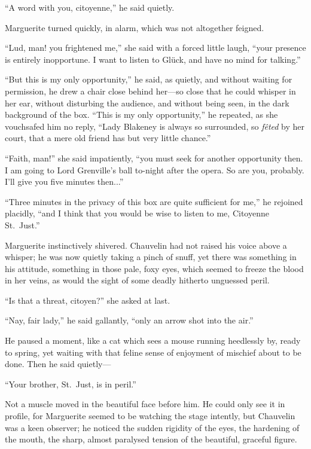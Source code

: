 \documentclass[paper=5.5in:8.5in,BCOR=7mm,twoside,DIV=calc,12pt,usegeometry,chapterprefix,endperiod,headings=big]{scrbook}
\begin{document}
\enquote{A word with you, citoyenne,} he said quietly.

Marguerite turned quickly, in alarm, which was not altogether feigned.

\enquote{Lud, man! you frightened me,} she said with a forced little laugh, \enquote{your presence is entirely inopportune. I want to listen to Glück, and have no mind for talking.}

\enquote{But this is my only opportunity,} he said, as quietly, and without waiting for permission, he drew a chair close behind her---so close that he could whisper in her ear, without disturbing the audience, and without being seen, in the dark background of the box. \enquote{This is my only opportunity,} he repeated, as she vouchsafed him no reply, \enquote{Lady Blakeney is always so surrounded, so \textit{fêted} by her court, that a mere old friend has but very little chance.}

\enquote{Faith, man!} she said impatiently, \enquote{you must seek for another opportunity then. I am going to Lord Grenville's ball to-night after the opera. So are you, probably. I'll give you five minutes then...}

\enquote{Three minutes in the privacy of this box are quite sufficient for me,} he rejoined placidly, \enquote{and I think that you would be wise to listen to me, Citoyenne St.~Just.}

Marguerite instinctively shivered. Chauvelin had not raised his voice above a whisper; he was now quietly taking a pinch of snuff, yet there was something in his attitude, something in those pale, foxy eyes, which seemed to freeze the blood in her veins, as would the sight of some deadly hitherto unguessed peril.

\enquote{Is that a threat, citoyen?} she asked at last.

\enquote{Nay, fair lady,} he said gallantly, \enquote{only an arrow shot into the air.}

He paused a moment, like a cat which sees a mouse running heedlessly by, ready to spring, yet waiting with that feline sense of enjoyment of mischief about to be done. Then he said quietly---

\enquote{Your brother, St.~Just, is in peril.}

Not a muscle moved in the beautiful face before him. He could only see it in profile, for Marguerite seemed to be watching the stage intently, but Chauvelin was a keen observer; he noticed the sudden rigidity of the eyes, the hardening of the mouth, the sharp, almost paralysed tension of the beautiful, graceful figure.
\end{document}
